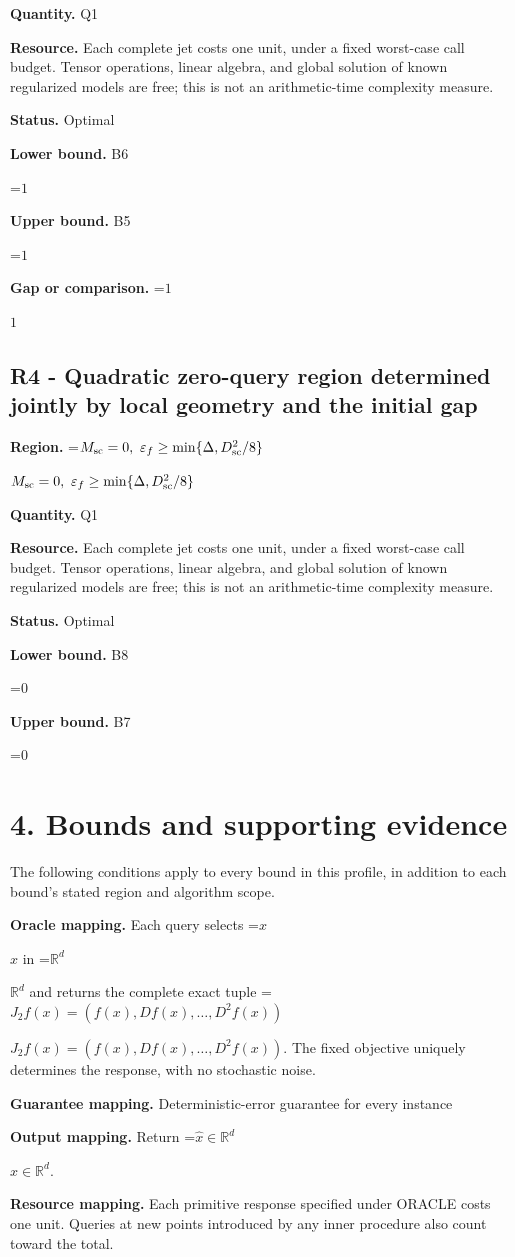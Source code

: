 \documentclass[10pt,a4paper]{article}
\newcommand{\AtlasMath}[1]{\par\begingroup\centering\setbox0=\hbox{$\displaystyle #1$}\ifdim\wd0>1.4\linewidth\typeout{ATLAS WIDE FORMULA: \the\wd0}\fi\ifdim\wd0>\linewidth\resizebox{\linewidth}{!}{\box0}\else\box0\fi\par\endgroup}
\newcommand{\AtlasInlineMath}[1]{\begingroup\setbox0=\hbox{$#1$}\ifdim\wd0>.4\linewidth\endgroup\AtlasMath{#1}\else\endgroup$#1$\fi}
\begin{document}
\textbf{Quantity.} Q1

\textbf{Resource.} Each complete jet costs one unit, under a fixed worst-case call budget. Tensor operations, linear algebra, and global solution of known regularized models are free; this is not an arithmetic-time complexity measure.

\textbf{Status.} Optimal

\textbf{Lower bound.} B6

\AtlasMath{1}
\textbf{Upper bound.} B5

\AtlasMath{1}
\textbf{Gap or comparison.} \AtlasInlineMath{1}

\subsection{R4 - Quadratic zero-query region determined jointly by local geometry and the initial gap}
\textbf{Region.} \AtlasInlineMath{M_{\rm sc}=0,\ \varepsilon_f\ge\min\{\Delta,D_{\rm sc}^2/8\}}

\textbf{Quantity.} Q1

\textbf{Resource.} Each complete jet costs one unit, under a fixed worst-case call budget. Tensor operations, linear algebra, and global solution of known regularized models are free; this is not an arithmetic-time complexity measure.

\textbf{Status.} Optimal

\textbf{Lower bound.} B8

\AtlasMath{0}
\textbf{Upper bound.} B7

\AtlasMath{0}
\section{4. Bounds and supporting evidence}
The following conditions apply to every bound in this profile, in addition to each bound's stated region and algorithm scope.

\textbf{Oracle mapping.} Each query selects \AtlasInlineMath{x} in \AtlasInlineMath{\mathbb{R}^d} and returns the complete exact tuple \AtlasInlineMath{J_{2}f(x)=(f(x),Df(x),\ldots,D^{2}f(x))}. The fixed objective uniquely determines the response, with no stochastic noise.

\textbf{Guarantee mapping.} Deterministic-error guarantee for every instance

\textbf{Output mapping.} Return \AtlasInlineMath{\widehat{x}\in \mathbb{R}^d}.

\textbf{Resource mapping.} Each primitive response specified under ORACLE costs one unit. Queries at new points introduced by any inner procedure also count toward the total.
\end{document}
